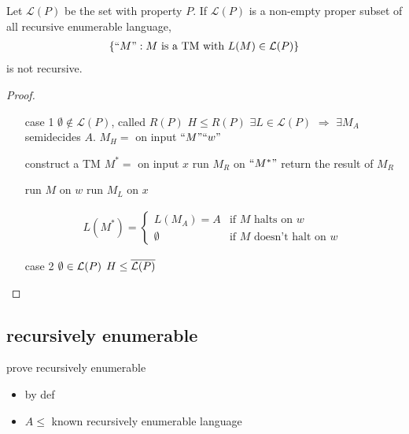 \begin{theorem}
    Let $\mathcal{L}(P)$ be the set with property $P$. If $\mathcal{L}(P)$ is a non-empty proper subset of all recursive enumerable language, 
    \begin{align*}
        \{ ``M": M\text{ is a TM with }L(M)\in \mathcal{L}(P) \}
    \end{align*}
    is not recursive. 
\end{theorem}
\begin{proof}\quad

    \begin{enumerate}
        \item [case 1] $\emptyset \notin \mathcal{L}(P)$, called $R(P)$
        \subitem $H\le R(P)$
        \subitem $\exists L\in \mathcal{L}(P)$ $\Rightarrow$ $\exists M_A$ semidecides $A$. 
        \subitem $M_H=$ on input $``M"``w"$
        \begin{algorithm}[H]
            \caption{$M_H$}
            \begin{algorithmic}
                \State construct a TM $M^*=$ on input $x$
                \State run $M_R$ on $``M^*"$
                \State return the result of $M_R$
            \end{algorithmic}
        \end{algorithm}

        \begin{algorithm}[H]
            \caption{$M^*$}
            \begin{algorithmic}
                \State run $M$ on $w$
                \State run $M_L$ on $x$
            \end{algorithmic}
        \end{algorithm}
        
        \begin{align*}
            L(M^*)=\left\{ \begin{array}{ll}
                L(M_A)=A & \text{if $M$ halts on }w\\
                \emptyset & \text{if $M$ doesn't halt on }w\
            \end{array} \right.
        \end{align*}
        \item [case 2] $\emptyset \in \mathcal{L}(P)$
        \subitem $H\le \overline{\mathcal{L}(P)}$
    \end{enumerate}
\end{proof}

\subsection{recursively enumerable}
prove recursively enumerable
\begin{itemize}
    \item by def
    \item $A\le$ known recursively enumerable language
\end{itemize}

